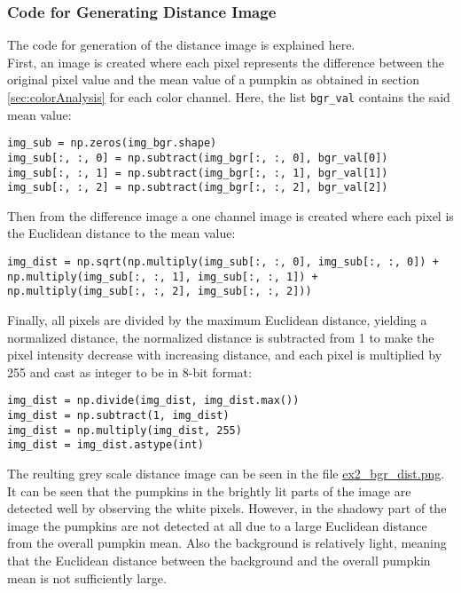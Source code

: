 \documentclass[../Head/Main.tex]{subfiles}
\begin{document}
\subsubsection{Code for Generating Distance Image}
The code for generation of the distance image is explained here.\\
First, an image is created where each pixel represents the difference between the original pixel value and the mean value of a pumpkin as obtained in section \ref{sec:colorAnalysis} for each color channel. Here, the list \verb+bgr_val+ contains the said mean value:
\begin{verbatim}
img_sub = np.zeros(img_bgr.shape)
img_sub[:, :, 0] = np.subtract(img_bgr[:, :, 0], bgr_val[0])
img_sub[:, :, 1] = np.subtract(img_bgr[:, :, 1], bgr_val[1])
img_sub[:, :, 2] = np.subtract(img_bgr[:, :, 2], bgr_val[2])
\end{verbatim}
Then from the difference image a one channel image is created where each pixel is the Euclidean distance to the mean value:
\begin{verbatim}
img_dist = np.sqrt(np.multiply(img_sub[:, :, 0], img_sub[:, :, 0]) +
np.multiply(img_sub[:, :, 1], img_sub[:, :, 1]) + 
np.multiply(img_sub[:, :, 2], img_sub[:, :, 2]))
\end{verbatim}
Finally, all pixels are divided by the maximum Euclidean distance, yielding a normalized distance, the normalized distance is subtracted from 1 to make the pixel intensity decrease with increasing distance, and each pixel is multiplied by 255 and cast as integer to be in 8-bit format:
\begin{verbatim}
img_dist = np.divide(img_dist, img_dist.max())
img_dist = np.subtract(1, img_dist)
img_dist = np.multiply(img_dist, 255)
img_dist = img_dist.astype(int) 
\end{verbatim}
The reulting grey scale distance image can be seen in the file \url{ex2_bgr_dist.png}. It can be seen that the pumpkins in the brightly lit parts of the image are detected well by observing the white pixels. However, in the shadowy part of the image the pumpkins are not detected at all due to a large Euclidean distance from the overall pumpkin mean. Also the background is relatively light, meaning that the Euclidean distance between the background and the overall pumpkin mean is not sufficiently large.
\end{document}
